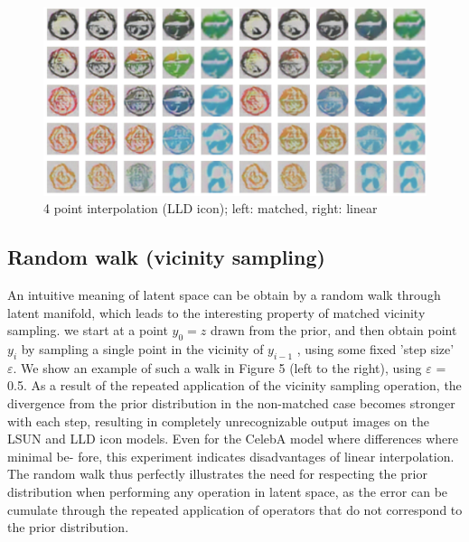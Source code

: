 \documentclass{article}
\begin{document}
\begin{center}
\begin{figure}
    \includegraphics[width=0.95\linewidth]{CelebA/images/LLD_int4_1.png}
    \caption{4 point interpolation (LLD icon); left: matched, right: linear}
\end{figure}
\end{center}


\subsection{Random walk (vicinity sampling)}
An intuitive meaning of latent space can be obtain by a random walk through latent manifold, which leads to the interesting property of matched vicinity sampling. we start at a point $y_0 = z$ drawn from the prior, and then obtain point $y_i$ by sampling a single point in the vicinity of $y_{i-1}$ , using some fixed ’step size’ $\varepsilon$. We show an example of such a walk in Figure 5 (left to the right), using $\varepsilon$ = 0.5. As a result of the repeated application of the vicinity sampling operation, the divergence from the prior distribution in the non-matched
case becomes stronger with each step, resulting in completely unrecognizable output images on the LSUN and LLD icon models. Even for the CelebA model where differences where minimal be-
fore, this experiment indicates disadvantages of linear interpolation. The random walk thus perfectly illustrates the need for respecting the prior distribution when performing any operation in latent space, as the error can be cumulate through the repeated application of operators that do not correspond to the prior distribution.
\end{document}
